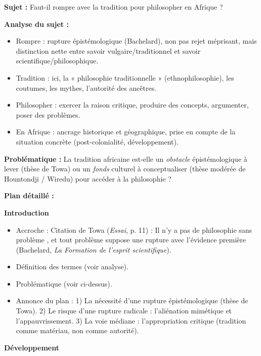 \documentclass[11pt]{article}
\newcommand{\cle}[1]{{\popxbold\color{popdark}#1}}
\begin{document}
\begin{exoresolu}
\textbf{Sujet :} \guillemotleft Faut-il rompre avec la tradition pour philosopher en Afrique ? \guillemotright

\tcblower

\textbf{Analyse du sujet :}
\begin{itemize}
    \item \cle{Rompre} : rupture épistémologique (Bachelard), non pas rejet méprisant, mais distinction nette entre savoir vulgaire/traditionnel et savoir scientifique/philosophique.
    \item \cle{Tradition} : ici, la « philosophie traditionnelle » (ethnophilosophie), les coutumes, les mythes, l'autorité des ancêtres.
    \item \cle{Philosopher} : exercer la raison critique, produire des concepts, argumenter, poser des problèmes.
    \item \cle{En Afrique} : ancrage historique et géographique, prise en compte de la situation concrète (post-colonialité, développement).
\end{itemize}

\textbf{Problématique :} La tradition africaine est-elle un \emph{obstacle} épistémologique à lever (thèse de Towa) ou un \emph{fonds} culturel à conceptualiser (thèse modérée de Hountondji / Wiredu) pour accéder à la philosophie ?

\textbf{Plan détaillé :}

\textbf{Introduction}
\begin{itemize}
    \item Accroche : Citation de Towa (\emph{Essai}, p. 11) : \guillemotleft Il n'y a pas de philosophie sans problème \guillemotright, et tout problème suppose une \cle{rupture avec l'évidence première} (Bachelard, \emph{La Formation de l'esprit scientifique}).
    \item Définition des termes (voir analyse).
    \item Problématique (voir ci-dessus).
    \item Annonce du plan : 1) La nécessité d'une rupture épistémologique (thèse de Towa). 2) Le risque d'une rupture radicale : l'aliénation mimétique et l'appauvrissement. 3) La voie médiane : l'appropriation critique (tradition comme matériau, non comme autorité).
\end{itemize}

\textbf{Développement}


\end{exoresolu}
\end{document}
